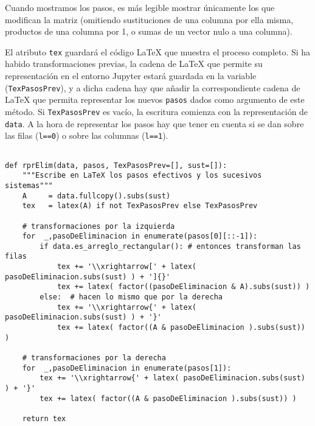 \documentclass[11pt]{report}
\begin{document}
Cuando mostramos los pasos, es más legible mostrar únicamente los
que modifican la matriz (omitiendo sustituciones de una columna por
ella misma, productos de una columna por 1, o sumas de un vector nulo
a una columna). 

El atributo \texttt{tex} guardará el código \LaTeX{} que muestra el proceso
completo. Si ha habido transformaciones previas, la cadena de \LaTeX{}
que permite su representación en el entorno Jupyter estará guardada en
la variable (\texttt{TexPasosPrev}), y a dicha cadena hay que añadir la
correspondiente cadena de \LaTeX{} que permita representar los nuevos \texttt{pasos} dados como argumento de este método. Si \texttt{TexPasosPrev} es
vacío, la escritura comienza con la representación de \texttt{data}. A la
hora de representar los pasos hay que tener en cuenta si se dan sobre
las filas (\texttt{l==0}) o sobre las columnas (\texttt{l==1}). 

\begin{verbatim}

def rprElim(data, pasos, TexPasosPrev=[], sust=[]):
    """Escribe en LaTeX los pasos efectivos y los sucesivos sistemas"""
    A     = data.fullcopy().subs(sust)
    tex   = latex(A) if not TexPasosPrev else TexPasosPrev
    
    # transformaciones por la izquierda
    for  _,pasoDeEliminacion in enumerate(pasos[0][::-1]):
        if data.es_arreglo_rectangular(): # entonces transforman las filas
            tex += '\\xrightarrow[' + latex( pasoDeEliminacion.subs(sust) ) + ']{}' 
            tex += latex( factor((pasoDeEliminacion & A).subs(sust)) )
        else:  # hacen lo mismo que por la derecha
            tex += '\\xrightarrow{' + latex( pasoDeEliminacion.subs(sust) ) + '}'
            tex += latex( factor((A & pasoDeEliminacion ).subs(sust)) )
        
    # transformaciones por la derecha
    for  _,pasoDeEliminacion in enumerate(pasos[1]):
        tex += '\\xrightarrow{' + latex( pasoDeEliminacion.subs(sust) ) + '}'
        tex += latex( factor((A & pasoDeEliminacion ).subs(sust)) )
                
    return tex

\end{verbatim}
\end{document}
